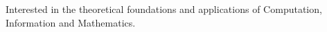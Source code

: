     \begin{cvparagraph}

        Interested in the theoretical foundations and applications of Computation, Information and Mathematics.
    \end{cvparagraph}
